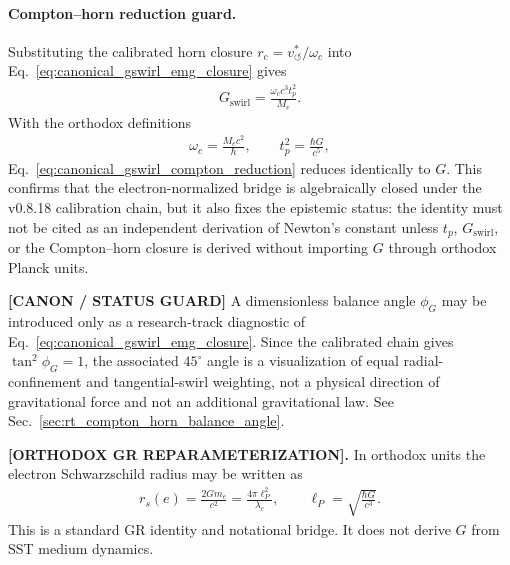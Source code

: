 \documentclass[11pt]{article}
\theoremstyle{definition}
\theoremstyle{plain}
\theoremstyle{remark}
\newcommand{\rc}{{r_c}}
\newcommand{\vchar}{v_{\!\boldsymbol{\circlearrowleft}}^{\ast}}
\begin{document}
        \paragraph{Compton--horn reduction guard.}
        Substituting the calibrated horn closure \(\rc=\vchar/\omega_c\) into Eq.~\eqref{eq:canonical_gswirl_emg_closure} gives
        \begin{align}
            G_{\mathrm{swirl}}
            =
            \frac{\omega_c c^3 t_p^2}{M_e}.
            \label{eq:canonical_gswirl_compton_reduction}
        \end{align}
        With the orthodox definitions
        \begin{align}
            \omega_c=\frac{M_ec^2}{\hbar},
            \qquad
            t_p^2=\frac{\hbar G}{c^5},
        \end{align}
        Eq.~\eqref{eq:canonical_gswirl_compton_reduction} reduces identically to \(G\). This confirms that the electron-normalized bridge is algebraically closed under the v0.8.18 calibration chain, but it also fixes the epistemic status: the identity must not be cited as an independent derivation of Newton's constant unless \(t_p\), \(G_{\mathrm{swirl}}\), or the Compton--horn closure is derived without importing \(G\) through orthodox Planck units.

        \textbf{[CANON / STATUS GUARD]} A dimensionless balance angle \(\phi_G\) may be introduced only as a research-track diagnostic of Eq.~\eqref{eq:canonical_gswirl_emg_closure}. Since the calibrated chain gives \(\tan^2\phi_G=1\), the associated \(45^\circ\) angle is a visualization of equal radial-confinement and tangential-swirl weighting, not a physical direction of gravitational force and not an additional gravitational law. See Sec.~\ref{sec:rt_compton_horn_balance_angle}.

        \textbf{[ORTHODOX GR REPARAMETERIZATION].}
        In orthodox units the electron Schwarzschild radius may be written as
        \begin{align}
            r_s(e)
            =
            \frac{2Gm_e}{c^2}
            =
            \frac{4\pi \ell_P^2}{\lambda_c},
            \qquad
            \ell_P=\sqrt{\frac{\hbar G}{c^3}}.
            \label{eq:orthodox_rs_planck_reparam}
        \end{align}
        This is a standard GR identity and notational bridge. It does not derive \(G\) from SST medium dynamics.
\end{document}

